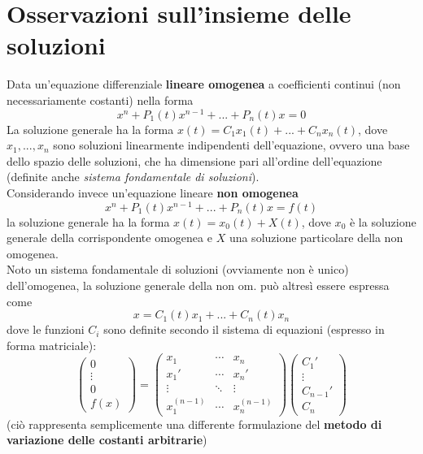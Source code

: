\documentclass[10pt, oneside]{book}
\theoremstyle{plain}
\begin{document}
\section{Osservazioni sull'insieme delle soluzioni}
Data un'equazione differenziale \textbf{lineare omogenea} a coefficienti continui (non necessariamente costanti) nella forma
\[x^{n} + P_1(t) x^{n-1} + ... + P_n(t) x = 0\]
La soluzione generale ha la forma $\displaystyle x(t) = C_1 x_1(t) + ... + C_n x_n(t)$, dove $x_1, ..., x_n$ sono soluzioni linearmente indipendenti dell'equazione, ovvero una base dello spazio delle soluzioni, che ha dimensione pari all'ordine dell'equazione (definite anche \textit{sistema fondamentale di soluzioni}).
\\Considerando invece un'equazione lineare \textbf{non omogenea}
\[x^{n} + P_1(t) x^{n-1} + ... + P_n(t) x = f(t)\]
la soluzione generale ha la forma $x(t) = x_0(t) + X(t)$, dove $x_0$ è la soluzione generale della corrispondente omogenea e $X$ una soluzione particolare della non omogenea. 
\\Noto un sistema fondamentale di soluzioni (ovviamente non è unico) dell'omogenea, la soluzione generale della non om. può altresì essere espressa come 
\[x = C_1(t) x_1 + ... + C_n(t) x_n\]
dove le funzioni $C_i$ sono definite secondo il sistema di equazioni (espresso in forma matriciale):
\[\begin{pmatrix}
0\\
\vdots \\
0\\
f(x)
\end{pmatrix} = \begin{pmatrix}
x_1 & \cdots & x_n\\
x_1' & \cdots & x_n'\\
\vdots & \ddots & \vdots\\
x_1^{(n-1)} & \cdots & x_n^{(n-1)}
\end{pmatrix} \begin{pmatrix}
C_1'\\
\vdots \\
C_{n-1}'\\
C_n
\end{pmatrix}\]
(ciò rappresenta semplicemente una differente formulazione del \textbf{metodo di variazione delle costanti arbitrarie})
\end{document}
